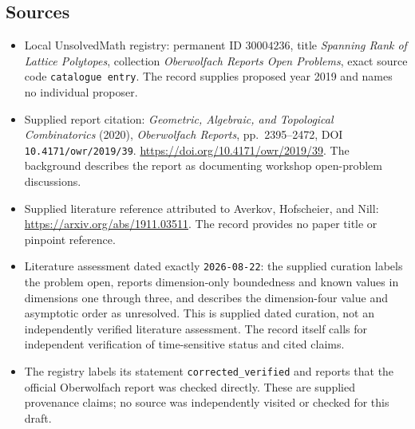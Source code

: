 \documentclass[11pt]{article}
\begin{document}
\subsection{Sources}
\begin{itemize}
\item Local UnsolvedMath registry: permanent ID \(30004236\), title \emph{Spanning Rank of Lattice Polytopes}, collection \emph{Oberwolfach Reports Open Problems}, exact source code \texttt{catalogue entry}. The record supplies proposed year 2019 and names no individual proposer.
\item Supplied report citation: \emph{Geometric, Algebraic, and Topological Combinatorics} (2020), \emph{Oberwolfach Reports}, pp.~2395--2472, DOI \texttt{10.4171/owr/2019/39}. \url{https://doi.org/10.4171/owr/2019/39}. The background describes the report as documenting workshop open-problem discussions.
\item Supplied literature reference attributed to Averkov, Hofscheier, and Nill: \url{https://arxiv.org/abs/1911.03511}. The record provides no paper title or pinpoint reference.
\item Literature assessment dated exactly \texttt{2026-08-22}: the supplied curation labels the problem open, reports dimension-only boundedness and known values in dimensions one through three, and describes the dimension-four value and asymptotic order as unresolved. This is supplied dated curation, not an independently verified literature assessment. The record itself calls for independent verification of time-sensitive status and cited claims.
\item The registry labels its statement \texttt{corrected\_verified} and reports that the official Oberwolfach report was checked directly. These are supplied provenance claims; no source was independently visited or checked for this draft.
\end{itemize}
\end{document}
